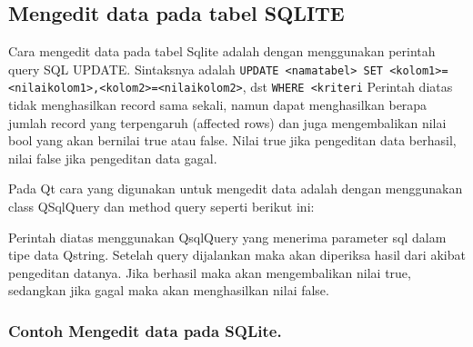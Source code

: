 \subsection{Mengedit data pada tabel SQLITE}\label{mengedit-data-pada-tabel-sqlite}

Cara mengedit data pada tabel Sqlite adalah dengan menggunakan perintah
query SQL UPDATE. Sintaksnya adalah
\texttt{UPDATE\ \textless{}namatabel\textgreater{}\ SET\ \textless{}kolom1\textgreater{}=\textless{}nilaikolom1\textgreater{},\textless{}kolom2\textgreater{}=\textless{}nilaikolom2\textgreater{}},
dst \texttt{WHERE\ \textless{}kriteri} Perintah diatas tidak
menghasilkan record sama sekali, namun dapat menghasilkan berapa jumlah
record yang terpengaruh (affected rows) dan juga mengembalikan nilai
bool yang akan bernilai true atau false. Nilai true jika pengeditan data
berhasil, nilai false jika pengeditan data gagal.

Pada Qt cara yang digunakan untuk mengedit data adalah dengan
menggunakan class QSqlQuery dan method query seperti berikut ini:



Perintah diatas menggunakan QsqlQuery yang menerima parameter sql dalam
tipe data Qstring. Setelah query dijalankan maka akan diperiksa hasil
dari akibat pengeditan datanya. Jika berhasil maka akan mengembalikan
nilai true, sedangkan jika gagal maka akan menghasilkan nilai false.

\subsubsection*{Contoh Mengedit data pada SQLite.}

